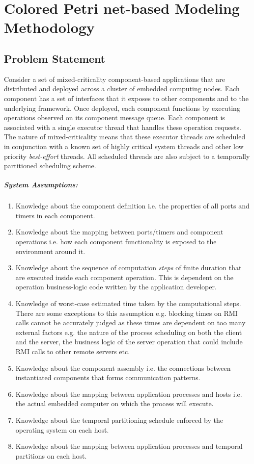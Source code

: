 \chapter{Colored Petri net-based Modeling Methodology}
\label{chapter:modeling}

\section{Problem Statement}

Consider a set of mixed-criticality component-based applications that are distributed and deployed across a cluster of embedded computing nodes. Each component has a set of interfaces that it exposes to other components and to the underlying framework. Once deployed, each component functions by executing operations observed on its component message queue. Each component is associated with a single executor thread that handles these operation requests. The nature of mixed-criticality means that these executor threads are scheduled in conjunction with a known set of highly critical system threads and other low priority \emph{best-effort} threads. All scheduled threads are also subject to a temporally partitioned scheduling scheme. 

\paragraph{System Assumptions:}
\begin{enumerate}
	\item Knowledge about the component definition i.e. the properties of all ports and timers in each component. 
	\item Knowledge about the mapping between ports/timers and component operations i.e. how each component functionality is exposed to the environment around it.
	\item Knowledge about the sequence of computation \emph{steps} of finite duration that are executed inside each component operation. This is dependent on the operation business-logic code written by the application developer.	
	\item Knowledge of worst-case estimated time taken by the computational steps. There are some exceptions to this assumption e.g. blocking times on RMI calls cannot be accurately judged as these times are dependent on too many external factors e.g. the nature of the process scheduling on both the client and the server, the business logic of the server operation that could include RMI calls to other remote servers etc.
	\item Knowledge about the component assembly i.e. the connections between instantiated components that forms communication patterns.
	\item Knowledge about the mapping between application processes and hosts i.e. the actual embedded computer on which the process will execute.
	\item Knowledge about the temporal partitioning schedule enforced by the operating system on each host.
	\item Knowledge about the mapping between application processes and temporal partitions on each host.
\end{enumerate}

